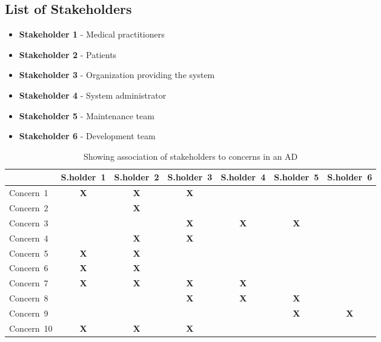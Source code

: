 \documentclass[10pt,oneside]{report}
\begin{document}
\subsection{List of Stakeholders}

\begin{itemize}
\item \textbf{Stakeholder 1} - Medical practitioners
\item \textbf{Stakeholder 2} - Patients
\item \textbf{Stakeholder 3} - Organization providing the system
\item \textbf{Stakeholder 4} - System administrator
\item \textbf{Stakeholder 5} - Maintenance team
\item \textbf{Stakeholder 6} - Development team
\end{itemize}

\begin{table}[h]
\caption{Showing association of stakeholders to concerns in an AD}\label{stakeholders concerns}
\begin{tabular}{ l | c | c | c | c | c | c }
				&\textsf{S.holder~1}	&\textsf{S.holder~2}	&\textsf{S.holder~3}	&\textsf{S.holder~4}	&\textsf{S.holder~5}	&\textsf{S.holder~6}	\\
\hline
\textsf{Concern~1}	&	\textbf{X}		&	\textbf{X}		&	\textbf{X}		& 				&				&				\\
\textsf{Concern~2}	&				&	\textbf{X}		& 				& 				&				&				\\
\textsf{Concern~3}	&				&				&	\textbf{X}		& 	\textbf{X}		&	\textbf{X}		&				\\
\textsf{Concern~4}	&				&	\textbf{X}		&	\textbf{X}		& 				&				&				\\
\textsf{Concern~5}	&	\textbf{X}		&	\textbf{X}		& 				& 				&				&				\\
\textsf{Concern~6}	&	\textbf{X}		&	\textbf{X}		& 				& 				&				&				\\
\textsf{Concern~7}	&	\textbf{X}		&	\textbf{X}		&	\textbf{X}		&	\textbf{X}		&				&				\\
\textsf{Concern~8}	&				& 				&	\textbf{X}		& 	\textbf{X}		&	\textbf{X}		&				\\
\textsf{Concern~9}	&				&				& 				& 				&	\textbf{X}		&	\textbf{X}		\\
\textsf{Concern~10}	&	\textbf{X}		&	\textbf{X}		&	\textbf{X}		& 				&				&				\\
\end{tabular}
\end{table}
\end{document}
